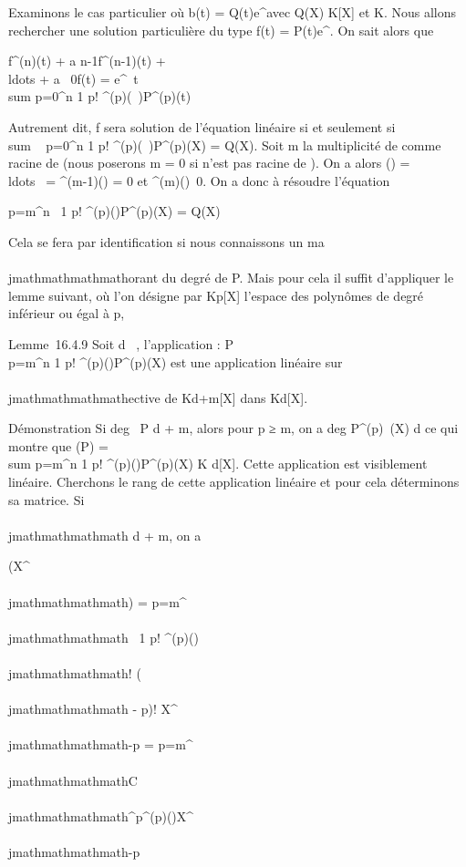 Examinons le cas particulier où b(t) = Q(t)e^\mut avec Q(X) \in
K{[}X{]} et \mu \in K. Nous allons rechercher une solution particulière du
type f(t) = P(t)e^\mut. On sait alors que

f^(n)(t) + a n-1f^(n-1)(t) +
\\ldots + a~
0f(t) = e^\lambda~t \\sum
p=0^n 1 \over p!
\chi^(p)(\lambda~)P^(p)(t)

Autrement dit, f sera solution de l'équation linéaire si et seulement
si~\\sum ~
p=0^n 1 \over p!
\chi^(p)(\lambda~)P^(p)(X) = Q(X). Soit m la multiplicité de
\mu comme racine de \chi (nous poserons m = 0 si \mu n'est pas racine de \chi). On
a alors \chi(\mu) =
\\ldots~ =
\chi^(m-1)(\mu) = 0 et
\chi^(m)(\mu)\neq~0. On a donc à résoudre
l'équation

\sum p=m^n~ 1
\over p! \chi^(p)(\mu)P^(p)(X) = Q(X)

Cela se fera par identification si nous connaissons un ma\\\\jmathmathmathmathorant du degré
de P. Mais pour cela il suffit d'appliquer le lemme suivant, où l'on
désigne par Kp{[}X{]} l'espace des polynômes de degré
inférieur ou égal à p,

Lemme~16.4.9 Soit d \in {}~, l'application \theta :
P\mapsto~\\\sum
 p=m^n 1 \over p!
\chi^(p)(\mu)P^(p)(X) est une application linéaire
sur\\\\jmathmathmathmathective de Kd+m{[}X{]} dans Kd{[}X{]}.

Démonstration Si deg~ P \leq d + m, alors pour p ≥
m, on a deg P^(p)~(X) \leq d ce qui
montre que \theta(P) =\ \\sum
 p=m^n 1 \over p!
\chi^(p)(\mu)P^(p)(X) \in K d{[}X{]}. Cette
application est visiblement linéaire. Cherchons le rang de cette
application linéaire et pour cela déterminons sa matrice. Si \\\\jmathmathmathmath \leq d + m,
on a

\theta(X^\\\\jmathmathmathmath) = \sum p=m^\\\\jmathmathmathmath~
1 \over p! \chi^(p)(\mu) \\\\jmathmathmathmath!
\over (\\\\jmathmathmathmath - p)! X^\\\\jmathmathmathmath-p =
\sum p=m^\\\\jmathmathmathmathC~
\\\\jmathmathmathmath^p\chi^(p)(\mu)X^\\\\jmathmathmathmath-p

